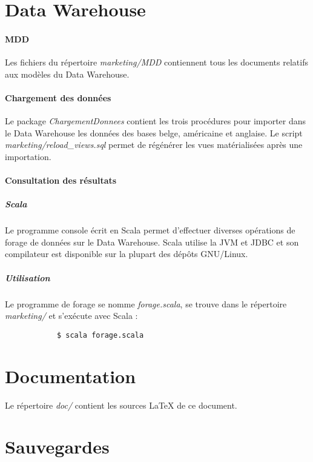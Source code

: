 \documentclass[a4paper,12pt,french]{article}
\begin{document}
\section{Data Warehouse}

    \paragraph{MDD}
    Les fichiers du répertoire \textit{marketing/MDD} contiennent tous les 
documents relatifs aux modèles du Data Warehouse.

    \paragraph{Chargement des données}
    Le package \textit{ChargementDonnees} contient les trois procédures pour 
importer dans le Data Warehouse les données des bases belge, américaine et 
anglaise. Le script \textit{marketing/reload\_views.sql} permet de régénérer 
les vues matérialisées après une importation.

    \paragraph{Consultation des résultats}

        \subparagraph{Scala}
        Le programme console écrit en Scala permet d'effectuer diverses
opérations de forage de données sur le Data Warehouse. Scala utilise la JVM et 
JDBC et son compilateur est disponible sur la plupart des dépôts GNU/Linux.

        \subparagraph{Utilisation}
        Le programme de forage se nomme \textit{forage.scala}, se trouve dans
le répertoire \textit{marketing/} et s'exécute avec Scala :
        \begin{lstlisting}
            $ scala forage.scala
        \end{lstlisting}

\section{Documentation}

    Le répertoire \textit{doc/} contient les sources \LaTeX{} de ce document.

\appendix

\section{Sauvegardes}
    
\end{document}
